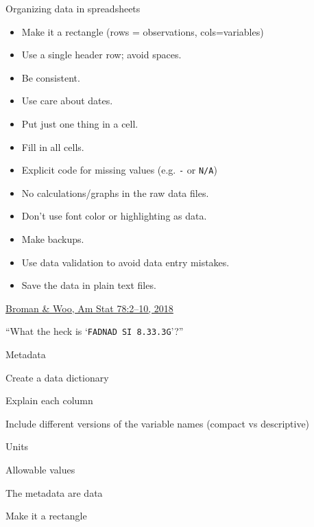 \documentclass[aspectratio=169,12pt,t]{beamer}
\begin{document}
\begin{frame}[c]{Organizing data in spreadsheets}

  \begin{itemize}
    \footnotesize
  \item Make it a rectangle (rows = observations, cols=variables)
  \item Use a single header row; avoid spaces.
  \item Be consistent.
  \item Use care about dates.
  \item Put just one thing in a cell.
  \item Fill in all cells.
  \item Explicit code for missing values (e.g. {\tt -} or {\tt N/A})
  \item No calculations/graphs in the raw data files.
  \item Don't use font color or highlighting as data.
  \item Make backups.
  \item Use data validation to avoid data entry mistakes.
  \item Save the data in plain text files.
  \end{itemize}


\vspace{7mm}

\hfill
{\footnotesize \lolit
\href{https://doi.org/10.1080/00031305.2017.1375989}{Broman \& Woo,
Am Stat 78:2--10, 2018}
}




\end{frame}




\begin{frame}[c]{}

\begin{center}
  \Large


``What the heck is `{\hilit \tt FAD{\textunderscore}NAD SI 8.3{\textunderscore}3.3G}'?''

\end{center}

\end{frame}




\begin{frame}[c]{Metadata}

  \bbi
\item Create a data dictionary
  \bi
\item Explain each column
\item Include different versions of the variable names (compact vs descriptive)
\item Units
\item Allowable values
  \ei
\item The metadata are data
  \bi
\item Make it a rectangle
  \ei
\ei

\end{frame}
\end{document}

